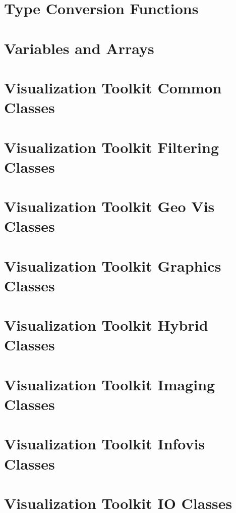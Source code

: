 \documentclass{book}
\begin{document}
\chapter{Type Conversion Functions}
\label{sec_typecast}
\hypertarget{sec_typecast}{}

\chapter{Variables and Arrays}
\label{sec_variables}
\hypertarget{sec_variables}{}

\chapter{Visualization Toolkit Common Classes}
\label{sec_vtkcommon}
\hypertarget{sec_vtkcommon}{}

\chapter{Visualization Toolkit Filtering Classes}
\label{sec_vtkfiltering}
\hypertarget{sec_vtkfiltering}{}

\chapter{Visualization Toolkit Geo Vis Classes}
\label{sec_vtkgeovis}
\hypertarget{sec_vtkgeovis}{}

\chapter{Visualization Toolkit Graphics Classes}
\label{sec_vtkgraphics}
\hypertarget{sec_vtkgraphics}{}

\chapter{Visualization Toolkit Hybrid Classes}
\label{sec_vtkhybrid}
\hypertarget{sec_vtkhybrid}{}

\chapter{Visualization Toolkit Imaging Classes}
\label{sec_vtkimaging}
\hypertarget{sec_vtkimaging}{}

\chapter{Visualization Toolkit Infovis Classes}
\label{sec_vtkinfovis}
\hypertarget{sec_vtkinfovis}{}

\chapter{Visualization Toolkit I\-O Classes}
\label{sec_vtkio}
\hypertarget{sec_vtkio}{}

\end{document}
